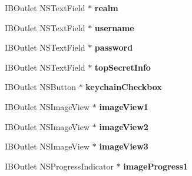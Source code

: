 \begin{DoxyCompactItemize}
\item 
\hypertarget{interface_app_delegate_ac0d3952fe97b97e4af0d65ade0d5f9d4}{
\-I\-B\-Outlet \-N\-S\-Text\-Field $\ast$ {\bfseries realm}}
\label{interface_app_delegate_ac0d3952fe97b97e4af0d65ade0d5f9d4}

\item 
\hypertarget{interface_app_delegate_a2848dfdeb4b8ece01aa65279198c3b35}{
\-I\-B\-Outlet \-N\-S\-Text\-Field $\ast$ {\bfseries username}}
\label{interface_app_delegate_a2848dfdeb4b8ece01aa65279198c3b35}

\item 
\hypertarget{interface_app_delegate_a66d6914094251fe0a24b4aa06cccb05b}{
\-I\-B\-Outlet \-N\-S\-Text\-Field $\ast$ {\bfseries password}}
\label{interface_app_delegate_a66d6914094251fe0a24b4aa06cccb05b}

\item 
\hypertarget{interface_app_delegate_a3964cf0ed9c215b492ab8588335c08de}{
\-I\-B\-Outlet \-N\-S\-Text\-Field $\ast$ {\bfseries top\-Secret\-Info}}
\label{interface_app_delegate_a3964cf0ed9c215b492ab8588335c08de}

\item 
\hypertarget{interface_app_delegate_aae26b0785ef7023491c78ee27ced5aa9}{
\-I\-B\-Outlet \-N\-S\-Button $\ast$ {\bfseries keychain\-Checkbox}}
\label{interface_app_delegate_aae26b0785ef7023491c78ee27ced5aa9}

\item 
\hypertarget{interface_app_delegate_a0ea1a841b8535ded1933e70b4a4da396}{
\-I\-B\-Outlet \-N\-S\-Image\-View $\ast$ {\bfseries image\-View1}}
\label{interface_app_delegate_a0ea1a841b8535ded1933e70b4a4da396}

\item 
\hypertarget{interface_app_delegate_ae61ebaed218b4c47e85a56163c61f62d}{
\-I\-B\-Outlet \-N\-S\-Image\-View $\ast$ {\bfseries image\-View2}}
\label{interface_app_delegate_ae61ebaed218b4c47e85a56163c61f62d}

\item 
\hypertarget{interface_app_delegate_ad9a69a1a4af9415d28b1fb04abf03f48}{
\-I\-B\-Outlet \-N\-S\-Image\-View $\ast$ {\bfseries image\-View3}}
\label{interface_app_delegate_ad9a69a1a4af9415d28b1fb04abf03f48}

\item 
\hypertarget{interface_app_delegate_a4fa0de53ac2cc32b9a47435679dce42d}{
\-I\-B\-Outlet \-N\-S\-Progress\-Indicator $\ast$ {\bfseries image\-Progress1}}
\label{interface_app_delegate_a4fa0de53ac2cc32b9a47435679dce42d}


\end{DoxyCompactItemize}
